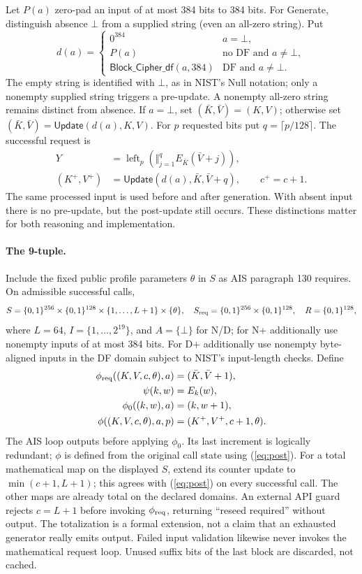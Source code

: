 \documentclass[11 pt,a 4 paper]{article}
\newcommand{\bits}{\{0,1\}}
\newcommand{\Upd}{\mathsf{Update}}
\newcommand{\DF}{\mathsf{Block\_Cipher\_df}}
\begin{document}
Let $ P(a)$ zero-pad an input of at most 384 bits to 384 bits. For Generate, distinguish absence $\bot $ from a supplied string (even an all-zero string). Put
\[
 d(a)=\begin{cases}0^{384}&a=\bot,\\P(a)&\text{no DF and }a\ne\bot,\\\DF(a,384)&\text{DF and }a\ne\bot.\end{cases}
\]
The empty string is identified with $\bot $, as in NIST's Null notation; only a nonempty supplied string triggers a pre-update. A nonempty all-zero string remains distinct from absence. If $ a=\bot $, set $(\bar K,\bar V)=(K,V)$; otherwise set $(\bar K,\bar V)=\Upd(d(a),K,V)$. For $ p $ requested bits put $ q=\lceil p/128\rceil $. The successful request is
\begin{align}
 Y&=\operatorname{left}_p\left(\big\Vert_{j=1}^{q} E_{\bar K}(\bar V+j)\right),\label{eq:out}\\
 (K^+,V^+)&=\Upd(d(a),\bar K,\bar V+q),\qquad c^+=c+1.\label{eq:post}
\end{align}
The same processed input is used before and after generation. With absent input there is no pre-update, but the post-update still occurs. These distinctions matter for both reasoning and implementation.

\paragraph{The 9-tuple.} Include the fixed public profile parameters $\theta $ in $ S $ as AIS paragraph 130 requires. On admissible successful calls,
\[
 S=\bits^{256}\times\bits^{128}\times\{1,\ldots,L+1\}\times\{\theta\},\quad
 S_{\rm req}=\bits^{256}\times\bits^{128},\quad R=\bits^{128},
\]
where $ L=64$, $ I=\{1,\ldots,2^{19}\}$, and $ A=\{\bot\}$ for N/D; for N+ additionally use nonempty inputs of at most 384 bits. For D+ additionally use nonempty byte-aligned inputs in the DF domain subject to NIST's input-length checks. Define
\begin{align*}
 \phi_{\rm req}((K,V,c,\theta),a)&=(\bar K,\bar V+1),\\
 \psi(k,w)&=E_k(w),\\
 \phi_0((k,w),a)&=(k,w+1),\\
 \phi((K,V,c,\theta),a,p)&=(K^+,V^+,c+1,\theta).
\end{align*}
The AIS loop outputs before applying $\phi_0$. Its last increment is logically redundant; $\phi $ is defined from the original call state using (\ref{eq:post}). For a total mathematical map on the displayed $ S $, extend its counter update to $\min(c+1,L+1)$; this agrees with (\ref{eq:post}) on every successful call. The other maps are already total on the declared domains. An external API guard rejects $ c=L+1$ before invoking $\phi_{\rm req}$, returning ``reseed required'' without output. The totalization is a formal extension, not a claim that an exhausted generator really emits output. Failed input validation likewise never invokes the mathematical request loop. Unused suffix bits of the last block are discarded, not cached.
\end{document}
